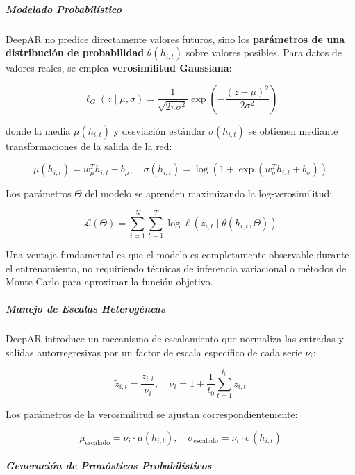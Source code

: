 \subparagraph{Modelado Probabilístico}

DeepAR no predice directamente valores futuros, sino los \textbf{parámetros de una distribución de probabilidad} $\theta(h_{i,t})$ sobre valores posibles. Para datos de valores reales, se emplea \textbf{verosimilitud Gaussiana}:

\begin{equation}
\ell_G(z \mid \mu, \sigma) = \frac{1}{\sqrt{2\pi\sigma^2}} \exp\left(-\frac{(z-\mu)^2}{2\sigma^2}\right)
\end{equation}

donde la media $\mu(h_{i,t})$ y desviación estándar $\sigma(h_{i,t})$ se obtienen mediante transformaciones de la salida de la red:

\begin{equation}
\mu(h_{i,t}) = w_{\mu}^T h_{i,t} + b_{\mu}, \quad \sigma(h_{i,t}) = \log(1 + \exp(w_{\sigma}^T h_{i,t} + b_{\sigma}))
\end{equation}

Los parámetros $\Theta$ del modelo se aprenden maximizando la log-verosimilitud:

\begin{equation}
\mathcal{L}(\Theta) = \sum_{i=1}^{N} \sum_{t=1}^{T} \log \ell(z_{i,t} \mid \theta(h_{i,t}, \Theta))
\end{equation}

Una ventaja fundamental es que el modelo es completamente observable durante el entrenamiento, no requiriendo técnicas de inferencia variacional o métodos de Monte Carlo para aproximar la función objetivo.

\subparagraph{Manejo de Escalas Heterogéneas}

DeepAR introduce un mecanismo de escalamiento que normaliza las entradas y salidas autorregresivas por un factor de escala específico de cada serie $\nu_i$:

\begin{equation}
\tilde{z}_{i,t} = \frac{z_{i,t}}{\nu_i}, \quad \nu_i = 1 + \frac{1}{t_0} \sum_{t=1}^{t_0} z_{i,t}
\end{equation}

Los parámetros de la verosimilitud se ajustan correspondientemente:

\begin{equation}
\mu_{\text{escalado}} = \nu_i \cdot \mu(h_{i,t}), \quad \sigma_{\text{escalado}} = \nu_i \cdot \sigma(h_{i,t})
\end{equation}

\subparagraph{Generación de Pronósticos Probabilísticos}

